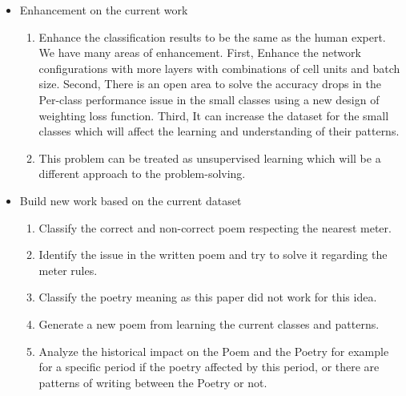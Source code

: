 \begin{itemize}
  \item Enhancement on the current work
  \begin{enumerate}
    \item Enhance the classification results to be the same as the human expert. We have many areas of enhancement. First, Enhance the network configurations with more layers with combinations of cell units and batch size. Second, There is an open area to solve the accuracy drops in the Per-class performance issue in the small classes using a new design of weighting loss function. Third, It can increase the dataset for the small classes which will affect the learning and understanding of their patterns.
    \item This problem can be treated as unsupervised learning which will be a different approach to the problem-solving.
  \end{enumerate}
  \item Build new work based on the current dataset
    \begin{enumerate}
    \item Classify the correct and non-correct poem respecting the nearest meter.
    \item Identify the issue in the written poem and try to solve it regarding the meter rules.
    \item Classify the poetry meaning as this paper did not work for this idea.
    \item Generate a new poem from learning the current classes and patterns.
    \item Analyze the historical impact on the Poem and the Poetry for example for a specific period if the poetry affected by this period, or there are patterns of writing between the Poetry or not.
  \end{enumerate}
  
\end{itemize}


